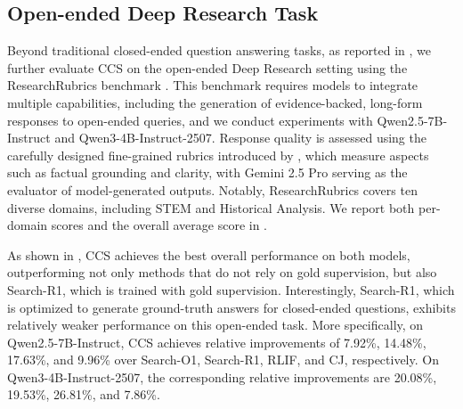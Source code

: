 
\subsection{Open-ended Deep Research Task}
Beyond traditional closed-ended question answering tasks, as reported in , we further evaluate CCS on the open-ended Deep Research setting using the ResearchRubrics benchmark \citep{researchrubrics}. This benchmark requires models to integrate multiple capabilities, including the generation of evidence-backed, long-form responses to open-ended queries, and we conduct experiments with Qwen2.5-7B-Instruct and Qwen3-4B-Instruct-2507. Response quality is assessed using the carefully designed fine-grained rubrics introduced by \citet{researchrubrics}, which measure aspects such as factual grounding and clarity, with Gemini 2.5 Pro \citep{comanici2025gemini} serving as the evaluator of model-generated outputs. Notably, ResearchRubrics covers ten diverse domains, including STEM and Historical Analysis. We report both per-domain scores and the overall average score in .

As shown in , CCS achieves the best overall performance on both models, outperforming not only methods that do not rely on gold supervision, but also Search-R1, which is trained with gold supervision. Interestingly, Search-R1, which is optimized to generate ground-truth answers for closed-ended questions, exhibits relatively weaker performance on this open-ended task. More specifically, on Qwen2.5-7B-Instruct, CCS achieves relative improvements of 7.92\%, 14.48\%, 17.63\%, and 9.96\% over Search-O1, Search-R1, RLIF, and CJ, respectively. On Qwen3-4B-Instruct-2507, the corresponding relative improvements are 20.08\%, 19.53\%, 26.81\%, and 7.86\%.